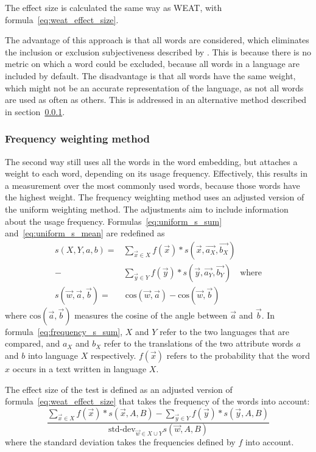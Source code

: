 The effect size is calculated the same way as WEAT, with
formula~\eqref{eq:weat_effect_size}.

The advantage of this approach is
that all words are considered, which eliminates the inclusion or exclusion subjectiveness
described by \textcite{nissim_fair_is_better_2020}.  This is because there is no metric
on which a word could be excluded, because all words in a language are included by default.
The disadvantage is that all words have the same weight, which might not be an accurate
representation of the language, as not all words are used as often as others. This is
addressed in an alternative method described in section~\ref{method:2}.

\subsubsection{Frequency weighting method}
\label{method:2}
The second way still uses all the words in the word embedding, but attaches a weight to
each word, depending on its usage frequency. Effectively, this results in a measurement
over the most commonly used words, because those words have the highest weight.
The frequency weighting method uses an adjusted version of the uniform weighting method.
The adjustments aim to include information about the usage frequency.
Formulas~\eqref{eq:uniform_s_sum} and~\eqref{eq:uniform_s_mean} are redefined
as
\begin{align} \label{eq:frequency_s_sum}
s(X,Y,a,b) =& \displaystyle\sum_{\vec{x} \in X}\! f(\vec{x})*s(\vec{x},\vec{a_X},\vec{b_X})
    \nonumber \\
-& \displaystyle\sum_{\vec{y} \in Y}\! f(\vec{y})\! *\! s(\vec{y},\vec{a_Y},\vec{b_Y})
    \quad\text{where} \\
\label{eq:frequency_s_mean}
s(\vec{w},\vec{a},\vec{b}) =&\ \text{cos}(\vec{w}, \vec{a}) - \text{cos}(\vec{w}, \vec{b})
\end{align}
where $\text{cos}(\vec{a}, \vec{b})$ measures the cosine of the angle between
$\vec{a}$ and $\vec{b}$. 
In formula~\eqref{eq:frequency_s_sum}, $X$ and $Y$ refer to the two languages that are
compared, and $a_X$ and $b_X$ refer to the translations of the
two attribute words $a$ and $b$ into language $X$ respectively. 
$f(\vec{x})$ refers to the probability that the word $x$ occurs in a text written
in language $X$.

The effect size of the test is defined as an adjusted version of
formula~\eqref{eq:weat_effect_size} that takes the frequency of the words into account:
\begin{equation}\label{eq:frequency_effect_size}
\frac{
    \displaystyle\sum_{\vec{x} \in X} f(\vec{x}) * s(\vec{x}, A, B) - \sum_{\vec{y} \in Y} f(\vec{y}) * s(\vec{y}, A, B)
}{
\text{std-dev}_{\vec{w} \in X \cup Y} s(\vec{w},A,B)
}
\end{equation}
where the standard deviation takes the frequencies defined by $f$ into account.


